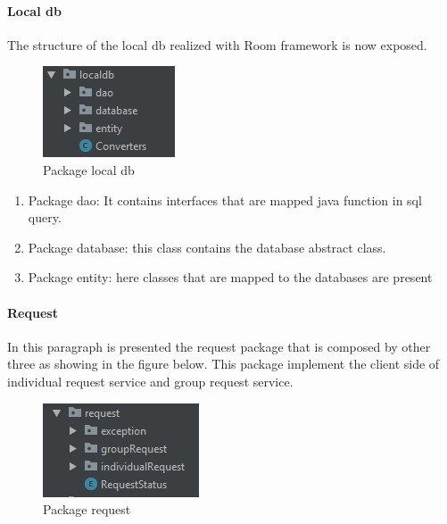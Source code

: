 \paragraph{Local db}
The structure of the local db realized with Room framework is now exposed.

\begin{figure}[H]
\includegraphics[width=\linewidth]{images/LocalDB.png}
\caption{ Package local db}
\label{fig:pkgsharedata}
\end{figure}

\begin{enumerate}
\item Package dao: It contains interfaces that are mapped java function in sql query.
\item Package database: this class contains the database abstract class.
\item Package entity: here classes that are mapped to the databases are present 
\end{enumerate}

\paragraph{Request}
In this paragraph is presented the request package that is composed by other three as showing in the figure below. This package implement the client side of individual request service and group request service.

\begin{figure}[H]
\includegraphics[width=\linewidth]{images/Request.png}
\caption{ Package request }
\label{fig:pkgsharedata}
\end{figure}

